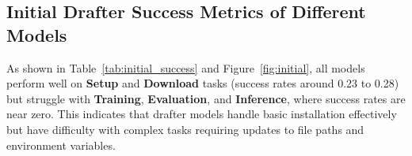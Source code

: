 

\subsection*{Initial Drafter Success Metrics of Different Models}

As shown in Table~\ref{tab:initial_success} and Figure~\ref{fig:initial}, all models perform well on \textbf{Setup} and \textbf{Download} tasks (success rates around 0.23 to 0.28) but struggle with \textbf{Training}, \textbf{Evaluation}, and \textbf{Inference}, where success rates are near zero. This indicates that drafter models handle basic installation effectively but have difficulty with complex tasks requiring updates to file paths and environment variables.

